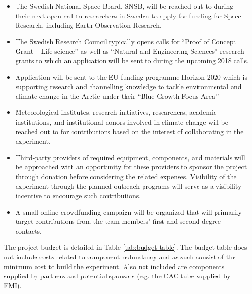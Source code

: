 \documentclass[a4paper,12pt,twoside]{article}
\begin{document}
\begin{itemize}
    \item The Swedish National Space Board, SNSB, will be reached out to during their next open call to researchers in Sweden to apply for funding for Space Research, including Earth Observation Research.
    \item The Swedish Research Council typically opens calls for \enquote{Proof of Concept Grant – Life science} as well as \enquote{Natural and Engineering Sciences} research grants to which an application will be sent to during the upcoming 2018 calls.
    \item Application will be sent to the EU funding programme Horizon 2020 which is supporting research and channelling knowledge to tackle environmental and climate change in the Arctic under their \enquote{Blue Growth Focus Area.}
    \item Meteorological institutes, research initiatives, researchers, academic institutions, and institutional donors involved in climate change will be reached out to for contributions based on the interest of collaborating in the experiment.
    \item Third-party providers of required equipment, components, and materials will be approached with an opportunity for these providers to sponsor the project through donation before considering the related expenses. Visibility of the experiment through the planned outreach programs will serve as a visibility incentive to encourage such contributions.
    \item A small online crowdfunding campaign will be organized that will primarily target contributions from the team members' first and second degree contacts.
\end{itemize}

The project budget is detailed in Table \ref{tab:budget-table}. The budget table does not include costs related to component redundancy and as such consist of the minimum cost to build the experiment. Also not included are components supplied by partners and potential sponsors (e.g. the CAC tube supplied by FMI).
\end{document}
